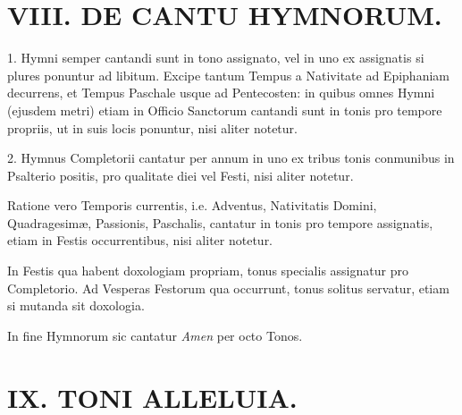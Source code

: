 \documentclass[vesperale_romanum.tex]{subfiles}
\begin{document}
\section[VIII. De Cantu Hymnorum]{VIII. DE CANTU HYMNORUM.}

1. Hymni semper cantandi sunt in tono assignato, vel in uno ex assignatis si plures ponuntur ad libitum. Excipe tantum Tempus a Nativitate ad Epiphaniam decurrens, et Tempus Paschale usque ad Pentecosten: in quibus omnes Hymni (ejusdem metri) etiam in Officio Sanctorum cantandi sunt in tonis pro tempore propriis, ut in suis locis ponuntur, nisi aliter notetur.

2. Hymnus Completorii cantatur per annum in uno ex tribus tonis conmunibus in Psalterio positis, pro qualitate diei vel Festi, nisi aliter notetur.

Ratione vero Temporis currentis, i.e. Adventus, Nativitatis Domini, Quadragesimæ, Passionis, Paschalis, cantatur in tonis pro tempore assignatis, etiam in Festis occurrentibus, nisi aliter notetur.

In Festis qua habent doxologiam propriam, tonus specialis assignatur pro Completorio. Ad Vesperas Festorum qua occurrunt, tonus solitus servatur, etiam si mutanda sit doxologia.


In fine Hymnorum sic cantatur \textit{Amen} per octo Tonos.

\altnormal


\section[IX. Toni « Allelúia »]{IX. TONI ALLELUIA.}




\altitshape
\end{document}
